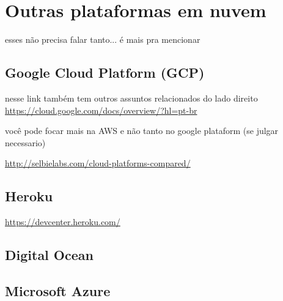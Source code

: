 \chapter{Outras plataformas em nuvem}

esses não precisa falar tanto... é mais pra mencionar

\section{Google Cloud Platform (GCP)}

nesse link também tem outros assuntos relacionados do lado direito
\url{https://cloud.google.com/docs/overview/?hl=pt-br}

você pode focar mais na AWS e não tanto no google plataform (se julgar necessario)


\url{http://selbielabs.com/cloud-platforms-compared/}

\section{Heroku}

\url{https://devcenter.heroku.com/}

\section{Digital Ocean}

\section{Microsoft Azure}

